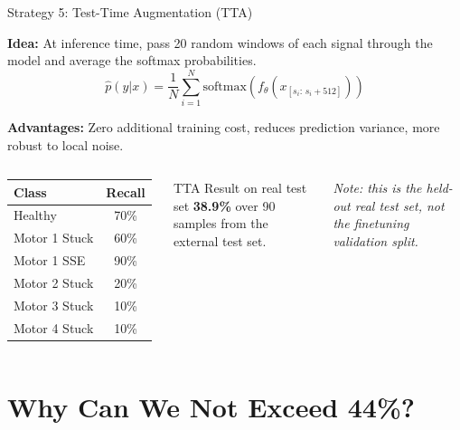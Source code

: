 \documentclass{beamer}
\begin{document}
\begin{frame}{Strategy 5: Test-Time Augmentation (TTA)}

    \textbf{Idea:} At inference time, pass 20 random windows of each signal through the model and average the softmax probabilities.
    \[
        \hat{p}(y|x) = \frac{1}{N}\sum_{i=1}^{N} \text{softmax}\!\left(f_\theta\!\left(x_{[s_i:\,s_i+512]}\right)\right)
    \]

    \vspace{0.2cm}
    \textbf{Advantages:} Zero additional training cost, reduces prediction variance, more robust to local noise.

    \vspace{0.2cm}
    \begin{columns}
        \begin{table}[]
            \footnotesize
            \begin{tabular}{@{}lc@{}}
                \toprule
                \textbf{Class} & \textbf{Recall} \\
                \midrule
                Healthy & 70\% \\
                Motor 1 Stuck & 60\% \\
                \textcolor{mygreen}{Motor 1 SSE} & \textcolor{mygreen}{90\%} \\
                Motor 2 Stuck & 20\% \\
                Motor 3 Stuck & 10\% \\
                Motor 4 Stuck & 10\% \\
                \bottomrule
            \end{tabular}
        \end{table}

        \begin{alertblock}{TTA Result on real test set}
            \textbf{38.9\%} over 90 samples from the external test set.
        \end{alertblock}
        \textit{Note: this is the held-out real test set, not the finetuning validation split.}
    \end{columns}
\end{frame}

\section{Why Can We Not Exceed 44\%?}
\end{document}
